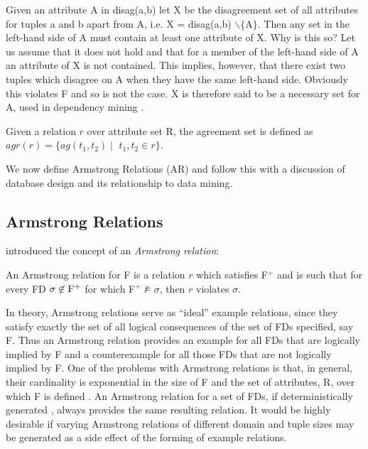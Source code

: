 Given an attribute A in disag(a,b) let X be the disagreement set of all
attributes for tuples a and b apart from A, i.e. X = disag(a,b) $\backslash \{$A$\}$.  
Then any set in the left-hand side of A must contain at least one
attribute of X. Why is this so?  Let us assume that it does not hold and
that for a member of the left-hand side of A an attribute of X is not
contained.  This implies, however, that there exist two tuples which disagree
on A when they have the same left-hand side.  Obviously this violates F and so is
not the case. X is therefore said to be a necessary set for A, used in
dependency mining \cite{Mann92}.

\begin{definition}
\begin{rm}
Given a relation $r$ over attribute set R, the agreement set is defined as
$agr(r) = \{ ag(t_1,t_2) \mid$ $t_1,t_2 \in r \}$.
\end{rm}
\end{definition}


We now define Armstrong Relations (AR) and
follow this with a discussion of database design and its relationship
to data mining.

\subsection{Armstrong Relations}


\cite{Arms74} introduced the concept of an {\em Armstrong relation}:  

\begin{definition}
\begin{rm}
An Armstrong relation for F is a relation $r$ which satisfies F$^+$
and is such
that for every FD $\sigma \not\in {\rm F}^+$ for which  F$^+ \not\models
\sigma$, then $r$ violates $\sigma$.
\end{rm}
\end{definition}

In theory, Armstrong relations \cite{fag82,bdfs84,dt95,gl90,lev95,mr86}
serve as ``ideal'' example relations, since they satisfy exactly the set of
all logical consequences of the set of FDs specified, say F.
Thus an Armstrong relation provides an example for all FDs
that are logically implied by F and a counterexample for all 
those FDs that are not logically implied by F.
One of the problems with Armstrong relations is that, in general,
their cardinality is exponential in the size of F and the set of attributes, R,
over which F is defined \cite{bdfs84}. An Armstrong relation for a
set of FDs, if
deterministically generated \cite{Mann92}, always provides
the same resulting relation. It would be highly desirable if varying Armstrong relations
of different domain and tuple sizes may be generated as a side effect of 
the forming of example relations.


